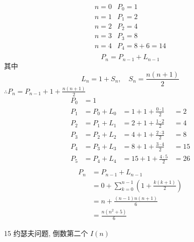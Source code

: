 \begin{answer}
	\begin{equation*}
		\begin{array}{ll}
			n=0	& P_0 = 1	\\
			n=1	& P_1 = 2	\\
			n=2 & P_2 = 4	\\
			n=3 & P_3 = 8	\\
			n=4 & P_4 = 8+6=14	\\
		\end{array}
	\end{equation*}
\begin{equation*}
	P_n = P_{n-1}+L_{n-1}
\end{equation*}
其中
\begin{equation*}
	L_n = 1+S_n,\quad S_n = \frac{n(n+1)}{2}
\end{equation*}
$ \therefore  P_n = P_{n-1}+1+\frac{n(n+1)}{2}$
\begin{equation*}
	\begin{array}{llll}
		P_0 &= 1 		& 							&		\\
		P_1 &= P_0+L_0 	&= 1+1+\frac{0\cdot 1 }{2} 	&= 2	\\ 
		P_2 &= P_1+L_1 	&= 2+1+\frac{1\cdot 2 }{2} 	&= 4	\\ 
		P_3 &= P_2+L_2 	&= 4+1+\frac{2\cdot 3 }{2} 	&= 8	\\ 
		P_4 &= P_3+L_3 	&= 8+1+\frac{3\cdot 4 }{2} 	&= 15	\\ 
		P_5 &= P_4+L_4 	&=15+1+\frac{4\cdot 5 }{2} 	&= 26	\\ 
	\end{array}
\end{equation*}
\begin{align*}
	P_n 
	&= P_{n-1}+L_{n-1} 		\\
	&= 0 + \sum_{k=0}^{n-1}\left(1+\frac{k(k+1)}{2}\right)	\\
	&= n + \frac{(n-1)n(n+1)}{6} \\
	&= \frac{n(n^2+5)}{6}
\end{align*}
\end{answer}

\begin{exercise}
	15 约瑟夫问题,  倒数第二个 $ I(n) $
\end{exercise}


